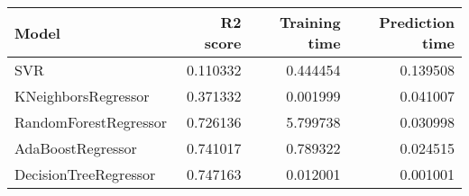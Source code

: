 \begin{tabular}{lrrr}
\toprule
Model & R2 score & Training time & Prediction time \\
\midrule
SVR & 0.110332 & 0.444454 & 0.139508 \\
KNeighborsRegressor & 0.371332 & 0.001999 & 0.041007 \\
RandomForestRegressor & 0.726136 & 5.799738 & 0.030998 \\
AdaBoostRegressor & 0.741017 & 0.789322 & 0.024515 \\
DecisionTreeRegressor & 0.747163 & 0.012001 & 0.001001 \\
\bottomrule
\end{tabular}
